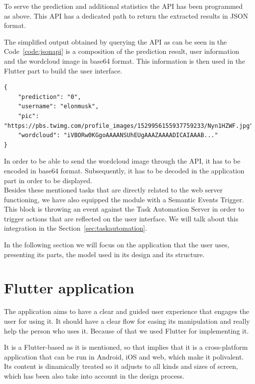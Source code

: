 To serve the prediction and additional statistics the API has been programmed as above. This API has a dedicated path to return the extracted results in JSON format.

The simplified output obtained by querying the API as can be seen in the Code~\ref{code:jsonapi} is a composition of the prediction result, user information and the wordcloud image in base64 format. This information is then used in the Flutter part to build the user interface.

\begin{lstlisting}[caption={JSON output from API}, label={code:jsonapi}]
{
    "prediction": "0", 
    "username": "elonmusk", 
    "pic": "https://pbs.twimg.com/profile_images/1529956155937759233/Nyn1HZWF.jpg", 
    "wordcloud": "iVBORw0KGgoAAAANSUhEUgAAAZAAAADICAIAAAB..."
}
\end{lstlisting}


In order to be able to send the wordcloud image through the API, it has to be encoded in base64 format. Subsequently, it has to be decoded in the application part in order to be displayed.\\

Besides these mentioned tasks that are directly related to the web server functioning, we have also equipped the module with a Semantic Events Trigger. This block is throwing an event against the Task Automation Server in order to trigger actions that are reflected on the user interface. We will talk about this integration in the Section~\ref{sec:taskautomation}.

In the following section we will focus on the application that the user uses, presenting its parts, the model used in its design and its structure.
\section{Flutter application}
The application aims to have a clear and guided user experience that engages the user for using it. It should have a clear flow for easing its manipulation and really help the person who uses it. Because of that we used Flutter for implementing it.

It is a Flutter-based as it is mentioned, so that implies that it is a cross-platform application that can be run in Android, iOS and web, which make it polivalent. Its content is dinamically treated so it adjusts to all kinds and sizes of screen, which has been also take into account in the design process.

